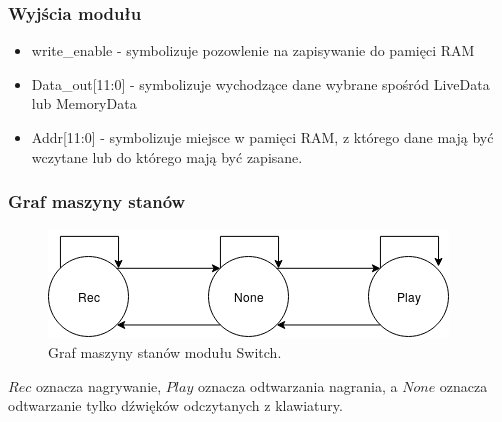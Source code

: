 \documentclass[a4paper,11pt]{article}
\begin{document}
\subsubsection*{Wyjścia modułu}
\begin{itemize}
\item write_enable - symbolizuje pozowlenie na zapisywanie do pamięci RAM
\item Data_out[11:0] - symbolizuje wychodzące dane wybrane spośród LiveData lub MemoryData
\item Addr[11:0] - symbolizuje miejsce w pamięci RAM, z którego dane mają być wczytane lub do którego mają być zapisane.
\end{itemize}

\subsubsection*{Graf maszyny stanów}
\begin{figure}[H]
\center
\includegraphics[scale=1]{switchmaszyna.png}
\caption{Graf maszyny stanów modułu Switch.}
\end{figure}
$Rec$ oznacza nagrywanie, $Play$ oznacza odtwarzania nagrania, a $None$ oznacza odtwarzanie tylko dźwięków odczytanych z klawiatury.
\end{document}
